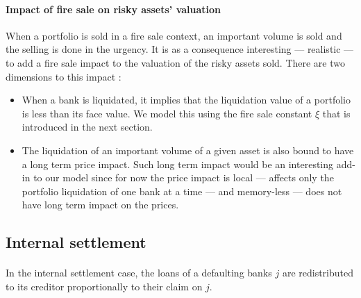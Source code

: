 \documentclass{article}
\begin{document}
\paragraph{Impact of fire sale on risky assets' valuation}
When a portfolio is sold in a fire sale context, an important volume is sold and the selling is done in the urgency. It is as a consequence interesting --- realistic --- to add a fire sale impact to the valuation of the risky assets sold. There are two dimensions to this impact :
\begin{itemize}
    \item When a bank is liquidated, it implies that the liquidation value of a portfolio is less than its face value. We model this using the fire sale constant $\xi$ that is introduced in the next section.
    \item The liquidation of an important volume of a given asset is also bound to have a long term price impact. Such long term impact would be an interesting add-in to our model since for now the price impact is local --- affects only the portfolio liquidation of one bank at a time --- and memory-less --- does not have long term impact on the prices.
\end{itemize}

\subsection{Internal settlement}\label{internal settlement}

\paragraph{}
In the internal settlement case, the loans of a defaulting banks $j$ are redistributed to its creditor proportionally to their claim on $j$.
\end{document}
